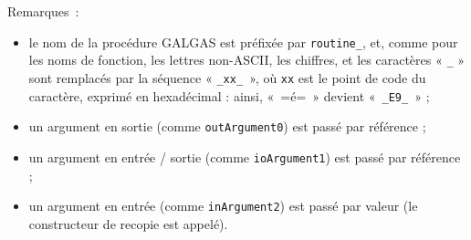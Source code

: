 Remarques~:
\begin{itemize}
  \item le nom de la procédure GALGAS est préfixée par \texttt{routine\_}, et, comme pour les noms de fonction, les lettres non-ASCII, les chiffres, et les caractères « \texttt{\_} »  sont remplacés par la séquence « \texttt{\_xx\_ }», où \texttt{xx} est le point de code du caractère, exprimé en hexadécimal : ainsi, «~\ggs=é=~» devient «~\texttt{\_E9\_}~» ;
  \item un argument en sortie (comme \texttt{outArgument0}) est passé par référence ;
  \item un argument en entrée / sortie (comme \texttt{ioArgument1}) est passé par référence ;
  \item un argument en entrée (comme \texttt{inArgument2}) est passé par valeur (le constructeur de recopie est appelé).
\end{itemize}


